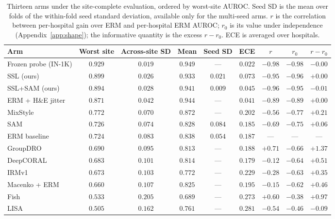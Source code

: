 \documentclass[10pt]{article} %
\begin{document}
\begin{table}[t]
\centering
\caption{Thirteen arms under the site-complete evaluation, ordered by
worst-site AUROC. Seed SD is the mean over folds of the within-fold seed
standard deviation, available only for the multi-seed arms. $r$ is the
correlation between per-hospital gain over ERM and per-hospital ERM AUROC;
$r_0$ is its value under independence (Appendix~\ref{app:shape}); the
informative quantity is the excess $r-r_0$. ECE is averaged over hospitals.}
\label{tab:eleven}
\small
\setlength{\tabcolsep}{4pt}
\begin{tabular}{lcccccccc}
\toprule
Arm & Worst site & Across-site SD & Mean & Seed SD & ECE & $r$ & $r_0$ & $r - r_0$ \\
\midrule
Frozen probe (IN-1K)          & $\mathbf{0.929}$ & $\mathbf{0.019}$ & $\mathbf{0.949}$ & --- & $\mathbf{0.022}$ & $-0.98$ & $-0.98$ & $-0.00$ \\
SSL (ours)                    & $0.899$ & $0.026$ & $0.933$ & $0.021$ & $0.073$ & $-0.95$ & $-0.96$ & $+0.00$ \\
SSL+SAM (ours)                & $0.894$ & $0.028$ & $0.941$ & $\mathbf{0.009}$ & $0.045$ & $-0.96$ & $-0.95$ & $-0.01$ \\
ERM + H\&E jitter             & $0.871$ & $0.042$ & $0.944$ & --- & $0.041$ & $-0.89$ & $-0.89$ & $+0.00$ \\
\midrule
MixStyle                      & $0.772$ & $0.070$ & $0.872$ & --- & $0.202$ & $-0.56$ & $-0.77$ & $+0.21$ \\
SAM                           & $0.726$ & $0.074$ & $0.828$ & $0.084$ & $0.185$ & $-0.69$ & $-0.75$ & $+0.06$ \\
ERM baseline                  & $0.724$ & $0.083$ & $0.838$ & $0.054$ & $0.187$ & --- & --- & --- \\
GroupDRO                      & $0.690$ & $0.095$ & $0.813$ & --- & $0.188$ & $+0.71$ & $-0.66$ & $+1.37$ \\
DeepCORAL                     & $0.683$ & $0.101$ & $0.814$ & --- & $0.179$ & $-0.12$ & $-0.64$ & $+0.51$ \\
IRMv1                         & $0.673$ & $0.103$ & $0.772$ & --- & $0.229$ & $-0.28$ & $-0.63$ & $+0.35$ \\
Macenko + ERM                 & $0.660$ & $0.107$ & $0.825$ & --- & $0.195$ & $-0.15$ & $-0.62$ & $+0.46$ \\
Fish                          & $0.533$ & $0.205$ & $0.689$ & --- & $0.273$ & $+0.60$ & $-0.38$ & $+0.97$ \\
LISA                          & $0.505$ & $0.162$ & $0.761$ & --- & $0.281$ & $-0.54$ & $-0.46$ & $-0.09$ \\
\bottomrule
\end{tabular}
\end{table}
\end{document}
